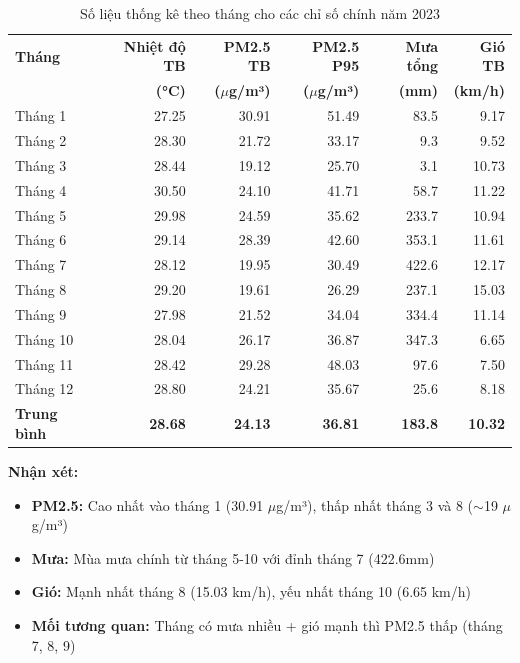 \documentclass[12pt,a4paper]{article}
\begin{document}
\begin{table}[H]
\centering
\small
\begin{tabular}{lrrrrr}
\toprule
\textbf{Tháng} & \textbf{Nhiệt độ TB} & \textbf{PM2.5 TB} & \textbf{PM2.5 P95} & \textbf{Mưa tổng} & \textbf{Gió TB} \\
 & \textbf{(°C)} & \textbf{($\mu$g/m³)} & \textbf{($\mu$g/m³)} & \textbf{(mm)} & \textbf{(km/h)} \\
\midrule
Tháng 1  & 27.25 & 30.91 & 51.49 & 83.5  & 9.17  \\
Tháng 2  & 28.30 & 21.72 & 33.17 & 9.3   & 9.52  \\
Tháng 3  & 28.44 & 19.12 & 25.70 & 3.1   & 10.73 \\
Tháng 4  & 30.50 & 24.10 & 41.71 & 58.7  & 11.22 \\
Tháng 5  & 29.98 & 24.59 & 35.62 & 233.7 & 10.94 \\
Tháng 6  & 29.14 & 28.39 & 42.60 & 353.1 & 11.61 \\
Tháng 7  & 28.12 & 19.95 & 30.49 & 422.6 & 12.17 \\
Tháng 8  & 29.20 & 19.61 & 26.29 & 237.1 & 15.03 \\
Tháng 9  & 27.98 & 21.52 & 34.04 & 334.4 & 11.14 \\
Tháng 10 & 28.04 & 26.17 & 36.87 & 347.3 & 6.65  \\
Tháng 11 & 28.42 & 29.28 & 48.03 & 97.6  & 7.50  \\
Tháng 12 & 28.80 & 24.21 & 35.67 & 25.6  & 8.18  \\
\midrule
\textbf{Trung bình} & \textbf{28.68} & \textbf{24.13} & \textbf{36.81} & \textbf{183.8} & \textbf{10.32} \\
\bottomrule
\end{tabular}
\caption{Số liệu thống kê theo tháng cho các chỉ số chính năm 2023}
\label{tab:monthly_data}
\end{table}

\textbf{Nhận xét:}
\begin{itemize}
    \item \textbf{PM2.5:} Cao nhất vào tháng 1 (30.91 $\mu$g/m³), thấp nhất tháng 3 và 8 ($\sim$19 $\mu$g/m³)
    \item \textbf{Mưa:} Mùa mưa chính từ tháng 5-10 với đỉnh tháng 7 (422.6mm)
    \item \textbf{Gió:} Mạnh nhất tháng 8 (15.03 km/h), yếu nhất tháng 10 (6.65 km/h)
    \item \textbf{Mối tương quan:} Tháng có mưa nhiều + gió mạnh thì PM2.5 thấp (tháng 7, 8, 9)
\end{itemize}
\end{document}
